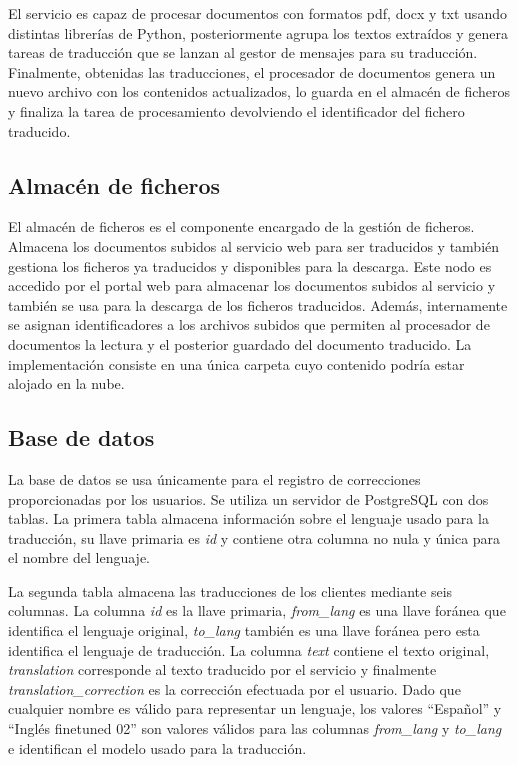 El servicio es capaz de procesar documentos con formatos pdf, docx y txt usando distintas librerías de Python, posteriormente agrupa los textos extraídos y genera tareas de traducción que se lanzan al gestor de mensajes para su traducción. Finalmente, obtenidas las traducciones, el procesador de documentos genera un nuevo archivo con los contenidos actualizados, lo guarda en el almacén de ficheros y finaliza la tarea de procesamiento devolviendo el identificador del fichero traducido.

\subsection{Almacén de ficheros}
El almacén de ficheros es el componente encargado de la gestión de ficheros. Almacena los documentos subidos al servicio web para ser traducidos y también gestiona los ficheros ya traducidos y disponibles para la descarga.
Este nodo es accedido por el portal web para almacenar los documentos subidos al servicio y también se usa para la descarga de los ficheros traducidos. Además, internamente se asignan identificadores a los archivos subidos que permiten al procesador de documentos la lectura y el posterior guardado del documento traducido.
La implementación consiste en una única carpeta cuyo contenido podría estar alojado en la nube.

\subsection{Base de datos}
La base de datos se usa únicamente para el registro de correcciones proporcionadas por los usuarios. Se utiliza un servidor de PostgreSQL con dos tablas. La primera tabla almacena información sobre el lenguaje usado para la traducción, su llave primaria es \textit{id} y contiene otra columna no nula y única para el nombre del lenguaje.

La segunda tabla almacena las traducciones de los clientes mediante seis columnas. La columna \textit{id} es la llave primaria, \textit{from\_lang} es una llave foránea que identifica el lenguaje original, \textit{to\_lang} también es una llave foránea pero esta identifica el lenguaje de traducción. La columna \textit{text} contiene el texto original, \textit{translation} corresponde al texto traducido por el servicio y finalmente \textit{translation\_correction} es la corrección efectuada por el usuario. Dado que cualquier nombre es válido para representar un lenguaje, los valores ``Español'' y ``Inglés finetuned 02'' son valores válidos para las columnas \textit{from\_lang} y \textit{to\_lang} e identifican el modelo usado para la traducción.

